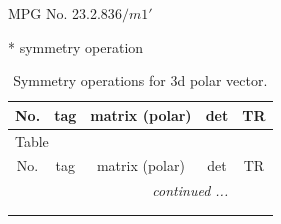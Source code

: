 \documentclass[fleqn,8pt]{jsarticle}
\begin{document}
\setcounter{MaxMatrixCols}{32}

\renewcommand{\tablename}{Table~}
\renewcommand{\figurename}{Figure~}
\begin{center}
\LARGE
MPG No. 23.2.83\quad$6/m1'$
\end{center}
* symmetry operation
\renewcommand{\arraystretch}{1.3}
\begin{longtable}{ccccc}
\caption{Symmetry operations for 3d polar vector.}
 \\
 \hline \hline
No. & tag & matrix (polar) & det & TR \\ \hline \endfirsthead

\multicolumn{4}{l}{\tablename\ \thetable{}} \\
 \hline \hline
No. & tag & matrix (polar) & det & TR \\ \hline \endhead

 \hline \hline
\multicolumn{4}{r}{\footnotesize\it continued ...} \\ \endfoot

 \hline \hline
\multicolumn{4}{r}{} \\ \endlastfoot


\end{longtable}
\end{document}
